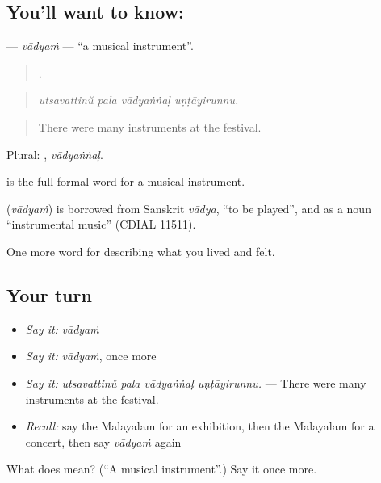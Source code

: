 \subsection*{You'll want to know: }
\textbf{} — \emph{vādyaṁ} — \textquotedblleft{}a musical instrument\textquotedblright{}.

\begin{quote}
   .
\end{quote}

\begin{quote}
\emph{utsavattinŭ pala vādyaṅṅaḷ uṇṭāyirunnu.}
\end{quote}

\begin{quote}
There were many instruments at the festival.
\end{quote}

Plural: , \emph{vādyaṅṅaḷ}.

 is the full formal word for a musical instrument.

\begin{cousinweb}
\textbf{} (\emph{vādyaṁ}) is borrowed from Sanskrit \emph{vādya}, \textquotedblleft{}to be played\textquotedblright{}, and as a noun \textquotedblleft{}instrumental music\textquotedblright{} (CDIAL 11511).
\end{cousinweb}

\begin{grammarlens}[title={What you've built}]
One more word for describing what you lived and felt.
\end{grammarlens}

\subsection*{Your turn}
\begin{itemize}
\raggedright
  \item \emph{Say it:} \emph{vādyaṁ}
  \item \emph{Say it:} \emph{vādyaṁ}, once more
  \item \emph{Say it:} \emph{utsavattinŭ pala vādyaṅṅaḷ uṇṭāyirunnu.} — There were many instruments at the festival.
  \item \emph{Recall:} say the Malayalam for an exhibition, then the Malayalam for a concert, then say \emph{vādyaṁ} again
\end{itemize}

\begin{tcolorbox}[breakable,colback=teal!4,colframe=teal!35!black,title={Before you move on}]
What does  mean? (\textquotedblleft{}A musical instrument\textquotedblright{}.) Say it once more.
\end{tcolorbox}
